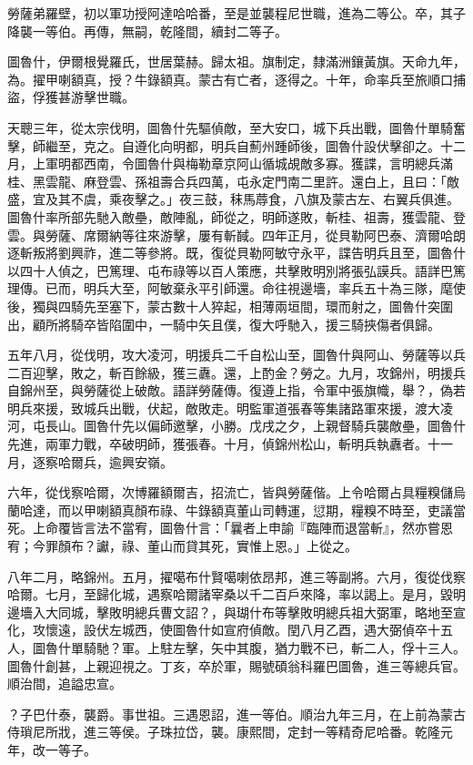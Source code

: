 \begin{pinyinscope}
勞薩弟羅壁，初以軍功授阿達哈哈番，至是並襲程尼世職，進為二等公。卒，其子降襲一等伯。再傳，無嗣，乾隆間，續封二等子。

圖魯什，伊爾根覺羅氏，世居葉赫。歸太祖。旗制定，隸滿洲鑲黃旗。天命九年，為。擢甲喇額真，授？牛錄額真。蒙古有亡者，逐得之。十年，命率兵至旅順口捕盜，俘獲甚游擊世職。

天聰三年，從太宗伐明，圖魯什先驅偵敵，至大安口，城下兵出戰，圖魯什單騎奮擊，師繼至，克之。自遵化向明都，明兵自薊州踵師後，圖魯什設伏擊卻之。十二月，上軍明都西南，令圖魯什與梅勒章京阿山循城覘敵多寡。獲諜，言明總兵滿桂、黑雲龍、麻登雲、孫祖壽合兵四萬，屯永定門南二里許。還白上，且曰：「敵盛，宜及其不虞，乘夜擊之。」夜三鼓，秣馬蓐食，八旗及蒙古左、右翼兵俱進。圖魯什率所部先馳入敵壘，敵陣亂，師從之，明師遂敗，斬桂、祖壽，獲雲龍、登雲。與勞薩、席爾納等往來游擊，屢有斬馘。四年正月，從貝勒阿巴泰、濟爾哈朗逐斬叛將劉興祚，進二等參將。既，復從貝勒阿敏守永平，諜告明兵且至，圖魯什以四十人偵之，巴篤理、屯布祿等以百人策應，共擊敗明別將張弘謨兵。語詳巴篤理傳。已而，明兵大至，阿敏棄永平引師還。命往視邊墻，率兵五十為三隊，麾使後，獨與四騎先至塞下，蒙古數十人猝起，相薄兩垣間，環而射之，圖魯什突圍出，顧所將騎卒皆陷圍中，一騎中矢且僕，復大呼馳入，援三騎挾傷者俱歸。

五年八月，從伐明，攻大凌河，明援兵二千自松山至，圖魯什與阿山、勞薩等以兵二百迎擊，敗之，斬百餘級，獲三纛。還，上酌金？勞之。九月，攻錦州，明援兵自錦州至，與勞薩從上破敵。語詳勞薩傳。復遵上指，令軍中張旗幟，舉？，偽若明兵來援，致城兵出戰，伏起，敵敗走。明監軍道張春等集諸路軍來援，渡大凌河，屯長山。圖魯什先以偏師邀擊，小勝。戊戌之夕，上親督騎兵襲敵壘，圖魯什先進，兩軍力戰，卒破明師，獲張春。十月，偵錦州松山，斬明兵執纛者。十一月，逐察哈爾兵，逾興安嶺。

六年，從伐察哈爾，次博羅額爾吉，招流亡，皆與勞薩偕。上令哈爾占具糧糗儲烏蘭哈達，而以甲喇額真顏布祿、牛錄額真董山司轉運，愆期，糧糗不時至，吏議當死。上命覆皆言法不當宥，圖魯什言：「曩者上申諭『臨陣而退當斬』，然亦嘗恩宥；今罪顏布？讞，祿、董山而貸其死，實惟上恩。」上從之。

八年二月，略錦州。五月，擢噶布什賢噶喇依昂邦，進三等副將。六月，復從伐察哈爾。七月，至歸化城，遇察哈爾諸宰桑以千二百戶來降，率以謁上。是月，毀明邊墻入大同城，擊敗明總兵曹文詔？，與瑚什布等擊敗明總兵祖大弼軍，略地至宣化，攻懷遠，設伏左城西，使圖魯什如宣府偵敵。閏八月乙酉，遇大弼偵卒十五人，圖魯什單騎馳？軍。上駐左擊，矢中其腹，猶力戰不已，斬二人，俘十三人。圖魯什創甚，上親迎視之。丁亥，卒於軍，賜號碩翁科羅巴圖魯，進三等總兵官。順治間，追謚忠宣。

？子巴什泰，襲爵。事世祖。三遇恩詔，進一等伯。順治九年三月，在上前為蒙古侍瑣尼所戕，進三等侯。子珠拉岱，襲。康熙間，定封一等精奇尼哈番。乾隆元年，改一等子。


\end{pinyinscope}
